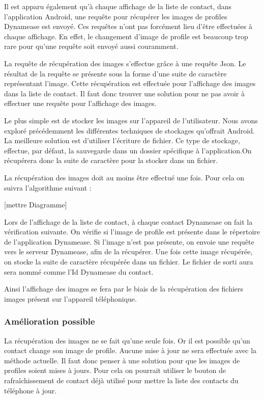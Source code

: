 Il est apparu également qu'à chaque affichage de la liste de contact, dans l'application Android, une requête pour récupérer les images de profiles Dynamease est envoyé. Ces requêtes n'ont pas forcément lieu d'être effectuées à chaque affichage. En effet, le changement d'image de profile est beaucoup trop rare pour qu'une requête soit envoyé aussi couramment.

La requête de récupération des images s'effectue grâce à une requête Json. Le résultat de la requête se présente sous la forme d'une suite de caractère représentant l'image. Cette récupération est effectuée pour l'affichage des images dans la liste de contact. Il faut donc trouver une solution pour ne pas avoir à effectuer une requête pour l'affichage des images.

Le plus simple est de stocker les images sur l'appareil de l'utilisateur. Nous avons exploré précédemment les différentes techniques de stockages qu'offrait Android. La meilleure solution est d'utiliser l'écriture de fichier. Ce type de stockage, effectue, par défaut, la sauvegarde dans un dossier spécifique à l'application.On récupérera donc la suite de caractère pour la stocker dans un fichier. 

La récupération des images doit au moins être effectué une fois. Pour cela on suivra l'algorithme suivant :

[mettre Diagramme]

Lors de l'affichage de la liste de contact, à chaque contact Dynamease on fait la vérification suivante. On vérifie si l'image de profile est présente dans le répertoire de l'application Dynamease. Si l'image n'est pas présente, on envoie une requête vers le serveur Dynamease, afin de la récupérer. Une fois cette image récupérée, on stocke la suite de caractère récupérée dans un fichier. Le fichier de sorti aura sera nommé comme l'Id Dynamease du contact.

Ainsi l'affichage des images se fera par le biais de la récupération des fichiers images présent sur l'appareil téléphonique.

\subsubsection{Amélioration possible}

La récupération des images ne se fait qu'une seule fois. Or il est possible qu'un contact change son image de profile. Aucune mise à jour ne sera effectuée avec la méthode actuelle. Il faut donc penser à une solution pour que les images de profiles soient mises à jours. Pour cela on pourrait utiliser le bouton de rafraîchissement de contact déjà utilisé pour mettre la liste des contacts du téléphone à jour. 
